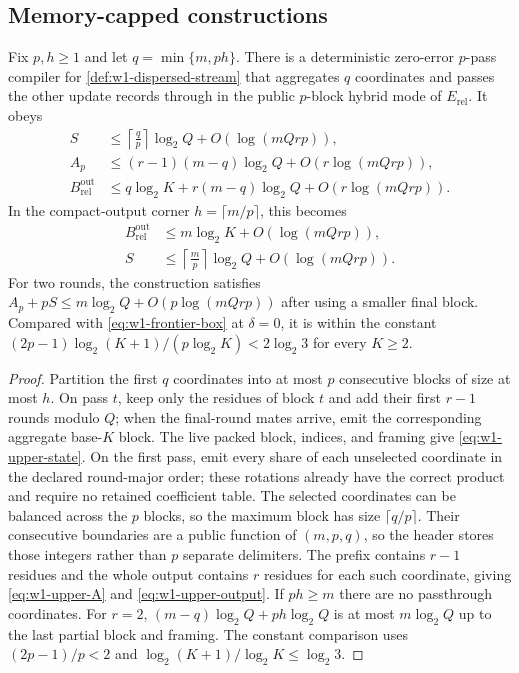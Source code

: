 \subsection{Memory-capped constructions}
\label{sec:w1-upper}

\begin{proposition}
\label{prop:w1-block-hybrid}
Fix $p,h\geq1$ and let $q=\min\{m,ph\}$.  There is a deterministic
zero-error $p$-pass compiler for \cref{def:w1-dispersed-stream} that
aggregates $q$ coordinates and passes the other update records through in
the public $p$-block hybrid mode of $E_{\mathrm{rel}}$.  It obeys
\begin{align}
 S&\leq \left\lceil\frac qp\right\rceil\log_2Q
       +O(\log(mQrp)),
 \label{eq:w1-upper-state}\\
 A_p&\leq(r-1)(m-q)\log_2Q+O(r\log(mQrp)),
 \label{eq:w1-upper-A}\\
 B_{\mathrm{rel}}^{\mathrm{out}}
 &\leq q\log_2K+r(m-q)\log_2Q
       +O(r\log(mQrp)).
 \label{eq:w1-upper-output}
\end{align}
In the compact-output corner $h=\lceil m/p\rceil$, this becomes
\begin{align}
 B_{\mathrm{rel}}^{\mathrm{out}}
 &\leq m\log_2K+O(\log(mQrp)),\\
 S&\leq\left\lceil\frac mp\right\rceil\log_2Q
       +O(\log(mQrp)).
 \label{eq:w1-compact-upper}
\end{align}
For two rounds, the construction satisfies
$A_p+pS\leq m\log_2Q+O(p\log(mQrp))$ after using a smaller final block.
Compared with
\eqref{eq:w1-frontier-box} at $\delta=0$, it is within the constant
$(2p-1)\log_2(K+1)/(p\log_2K)<2\log_2 3$ for every $K\geq2$.
\end{proposition}

\begin{proof}
Partition the first $q$ coordinates into at most $p$ consecutive blocks of
size at most $h$.  On pass $t$, keep only the residues of block $t$ and add
their first $r-1$ rounds modulo $Q$; when the final-round mates arrive,
emit the corresponding aggregate base-$K$ block.  The live packed block,
indices, and framing give \eqref{eq:w1-upper-state}.  On the first pass,
emit every share of each unselected coordinate in the declared round-major
order; these rotations already have the correct product and require no
retained coefficient table.  The selected coordinates can be balanced
across the $p$ blocks, so the maximum block has size $\lceil q/p\rceil$.
Their consecutive boundaries are a public function of $(m,p,q)$, so the
header stores those integers rather than $p$ separate delimiters.
The prefix contains $r-1$ residues and the
whole output contains $r$ residues for each such coordinate, giving
\eqref{eq:w1-upper-A} and \eqref{eq:w1-upper-output}.  If $ph\geq m$ there
are no passthrough coordinates.  For $r=2$, $(m-q)\log_2Q+ph\log_2Q$ is
at most $m\log_2Q$ up to the last partial block and framing.  The constant
comparison uses $(2p-1)/p<2$ and
$\log_2(K+1)/\log_2K\leq\log_2 3$.
\end{proof}

